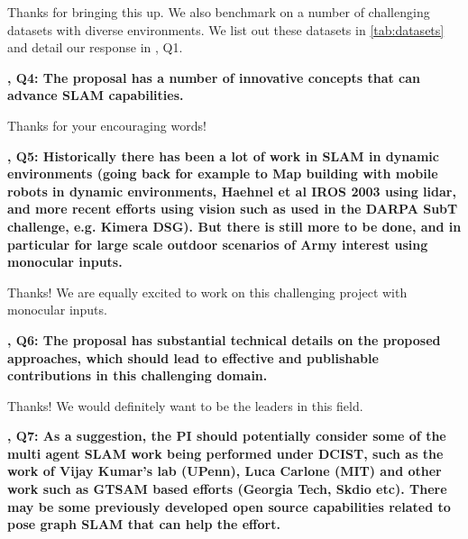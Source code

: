 \documentclass[12pt]{article}
\newcommand{\revThree}{{\color{my_magenta}{R3}}}
\newcommand{\revFour}{{\color{my_blue}{R4}}}
\begin{document}
    Thanks for bringing this up. 
    We also benchmark on a number of challenging datasets with diverse environments. 
    We list out these datasets in \cref{tab:datasets} and detail our response in \revThree, Q1.

    \textbf{\revFour, Q4: The proposal has a number of innovative concepts that can advance SLAM capabilities.}

    Thanks for your encouraging words!

    \textbf{\revFour, Q5: Historically there has been a lot of work in SLAM in dynamic environments (going back for example to Map building with mobile robots in dynamic environments, Haehnel et al IROS 2003 using lidar, and more recent efforts using vision such as used in the DARPA SubT challenge, e.g. Kimera DSG). But there is still more to be done, and in particular for large scale outdoor scenarios of Army interest using monocular inputs.    
    }

    Thanks! We are equally excited to work on this challenging project with monocular inputs.

    \textbf{\revFour, Q6: The proposal has substantial technical details on the proposed approaches, which should lead to effective and publishable contributions in this challenging domain.
    }

    Thanks! We would definitely want to be the leaders in this field.

    \textbf{\revFour, Q7: As a suggestion, the PI should potentially consider some of the multi agent SLAM work being performed under DCIST, such as the work of Vijay Kumar's lab (UPenn), Luca Carlone (MIT) and other work such as GTSAM based efforts (Georgia Tech, Skdio etc). There may be some previously developed open source capabilities related to pose graph SLAM that can help the effort.
    }
\end{document}
